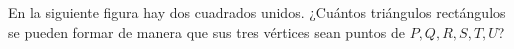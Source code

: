 En la siguiente figura hay dos cuadrados unidos. ¿Cuántos triángulos rectángulos se pueden formar de manera que sus tres vértices sean puntos de $P,Q,R,S,T,U$?